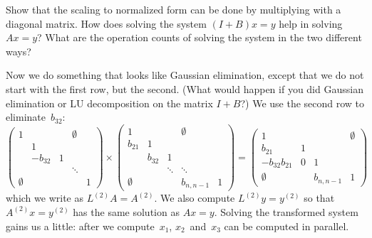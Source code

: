 \begin{exercise}
  Show that the scaling to normalized form can be done by multiplying
  with a diagonal matrix. 
  How does solving the system $(I+B)x=y$ help in solving $Ax=y$? What
  are the operation counts of solving the system in the two different ways?
\end{exercise}

Now we do something that looks like Gaussian elimination, except that
we do not start with the first row, but the second. (What would happen
if you did Gaussian elimination or LU decomposition on the matrix
$I+B$?) We use the second row to eliminate~$b_{32}$:
\[
  \begin{pmatrix}
    1&&&\emptyset\\ &1\\ &-b_{32}&1\\ &&&\ddots\\
    \emptyset&&&&1
  \end{pmatrix}\times
  \begin{pmatrix}
    1&&&\emptyset\\ b_{21}&1\\ &b_{32}&1\\ &&\ddots&\ddots\\ 
    \emptyset&&&b_{n,n-1}&1
  \end{pmatrix}
  =
  \begin{pmatrix}
    1&&&\emptyset\\ b_{21}&1\\ -b_{32}b_{21}&0&1\\ 
    \emptyset&&b_{n,n-1}&1
  \end{pmatrix}
\]
which we write as $L^{(2)}A=A^{(2)}$. We also compute
$L^{(2)}y=y^{(2)}$ so that $A^{(2)}x=y^{(2)}$ has the same solution as
$Ax=y$. Solving the transformed system gains us a little: after we
compute~$x_1$, $x_2$~and~$x_3$ can be computed in parallel.

